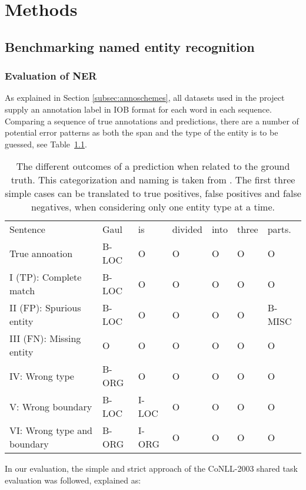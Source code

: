 \documentclass[main.tex]{subfiles}
\begin{document}
\chapter{Methods}
\label{chap:methods}

\section{Benchmarking named entity recognition}
\subsection{Evaluation of NER}
\label{subsec:nereval}
As explained in Section \ref{subsec:annoschemes}, all datasets used in the project supply an annotation label in IOB format \cite{ramshaw1995IOB} for each word in each sequence.
Comparing a sequence of true annotations and predictions, there are a number of potential error patterns as both the span and the type of the entity is to be guessed, see Table~\ref{tab:eval}.
\begin{table}[H]
    \footnotesize
    \centering
    \begin{tabular}{l|llllll}
        Sentence                    & Gaul & is & divided & into & three & parts.\\
        True annoation              & B-LOC & O & O & O & O & O \\\hline
        I (TP): Complete match      & B-LOC & O & O & O & O & O \\
        II (FP): Spurious entity    & B-LOC & O & O & O & O & B-MISC \\
        III (FN): Missing entity    & O     & O & O & O & O & O \\
        IV: Wrong type              & B-ORG & O & O & O & O & O \\
        V: Wrong boundary           & B-LOC & I-LOC & O & O & O & O \\
        VI: Wrong type and boundary & B-ORG & I-ORG & O & O & O & O
    \end{tabular}
    \caption{
        The different outcomes of a prediction when related to the ground truth.
        This categorization and naming is taken from \cite{batista2018eval}.
        The first three simple cases can be translated to true positives, false positives and false negatives, when considering only one entity type at a time.
    }
    \label{tab:eval}
\end{table}\noindent
In our evaluation, the simple and strict approach of the CoNLL-2003 shared task evaluation was followed, explained as:
\end{document}
